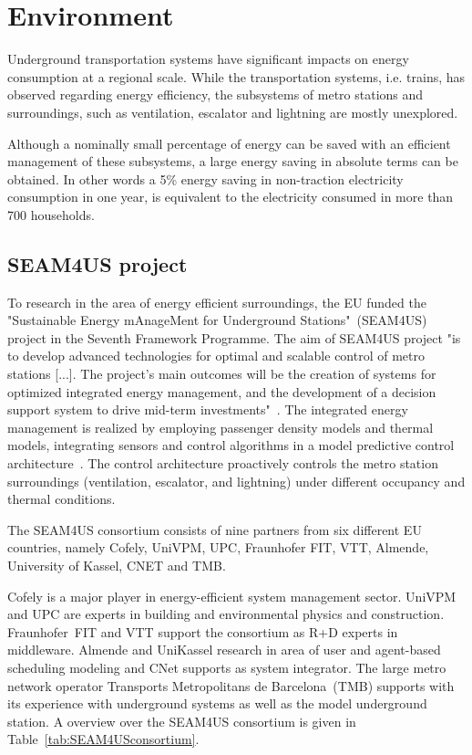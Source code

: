 \section{Environment}
\label{sec:environment}

Underground transportation systems have significant impacts on energy consumption at a regional scale. While the transportation systems, i.e. trains, has observed regarding energy efficiency, the subsystems of metro stations and surroundings, such as ventilation, escalator and lightning are mostly unexplored.

Although a nominally small percentage of energy can be saved with an efficient management of these subsystems, a large energy saving in absolute terms can be obtained. In other words a 5\% energy saving in non-traction electricity consumption in one year, is equivalent to the electricity consumed in more than 700 households. 

\subsection{SEAM4US project}
\label{subsec:seam4us}

To research in the area of energy efficient surroundings, the EU funded the "Sustainable Energy mAnageMent for Underground Stations"~(SEAM4US) project in the Seventh Framework Programme.
The aim of SEAM4US project "is to develop advanced technologies for optimal and scalable control of metro stations [...]. The project's main outcomes will be the creation of systems for optimized integrated energy management, and the development of a decision support system to drive mid-term investments"~\cite{SEAM4US_Website}.
The integrated energy management is realized by employing passenger density models and thermal models, integrating sensors and control algorithms in a model predictive control architecture~\cite{ansuini_models_2013}. The control architecture proactively controls the metro station surroundings (ventilation, escalator, and lightning) under different occupancy and thermal conditions.

The SEAM4US consortium consists of nine partners from six different EU countries, namely Cofely, UniVPM, UPC, Fraunhofer FIT, VTT, Almende, University of Kassel, CNET and TMB.

Cofely is a major player in energy-efficient system management sector.
UniVPM and UPC are experts in building and environmental physics and construction.
Fraunhofer~FIT and VTT support the consortium as R+D experts in middleware.
Almende and UniKassel research in area of user and agent-based scheduling modeling and CNet supports as system integrator.
The large metro network operator Transports Metropolitans de Barcelona~(TMB) supports with its experience with underground systems as well as the model underground station.
A overview over the SEAM4US consortium is given in Table~\ref{tab:SEAM4USconsortium}.

